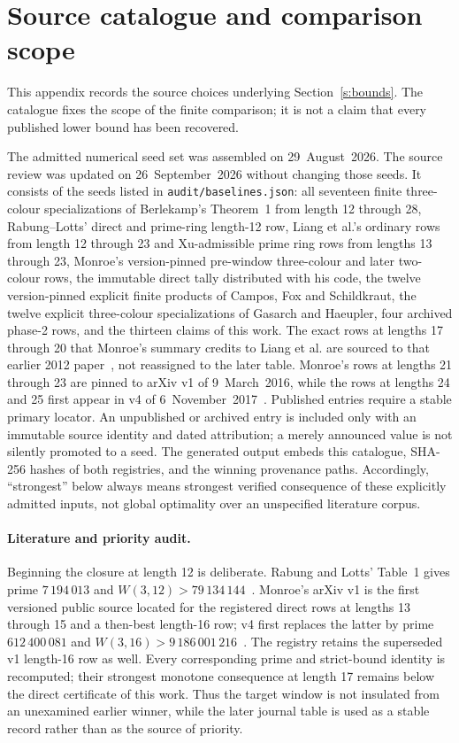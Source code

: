 \section{Source catalogue and comparison scope}\label{s:source-catalogue}

This appendix records the source choices underlying Section~\ref{s:bounds}.
The catalogue fixes the scope of the finite comparison; it is not a claim
that every published lower bound has been recovered.

The admitted numerical seed set was assembled on 29~August~2026. The source
review was updated on 26~September~2026 without changing those seeds. It consists of the
seeds listed in \texttt{audit/baselines.json}: all seventeen finite three-colour
specializations of Berlekamp's Theorem~1 from length 12 through 28,
Rabung--Lotts' direct and prime-ring length-12 row, Liang et al.'s ordinary rows
from length 12 through 23 and Xu-admissible prime ring rows from lengths 13 through 23,
Monroe's version-pinned pre-window three-colour and later two-colour rows, the
immutable direct tally distributed with his code, the twelve
version-pinned explicit finite products of Campos, Fox and Schildkraut, the
twelve explicit three-colour specializations of Gasarch and Haeupler, four
archived phase-2 rows, and the thirteen claims of this work. The exact rows at
lengths 17 through 20 that Monroe's summary credits to Liang et al. are sourced
to that earlier 2012 paper~\cite{liang2012}, not reassigned to the later table.
Monroe's rows at lengths 21 through 23 are pinned to arXiv v1 of
9~March~2016, while the rows at lengths 24 and 25 first appear in v4 of
6~November~2017~\cite{Monroe2016v1,Monroe2017v4}.
Published entries require a stable primary locator. An unpublished or
archived entry is included only with an immutable source identity and dated
attribution; a merely announced value is not silently promoted to a seed. The
generated output embeds this catalogue, SHA-256 hashes of both registries, and
the winning provenance paths. Accordingly, ``strongest'' below always means
strongest verified consequence of these explicitly admitted inputs, not global
optimality over an unspecified literature corpus.

\paragraph{Literature and priority audit.}
Beginning the closure at length 12 is deliberate. Rabung and Lotts' Table~1
gives prime $7\,194\,013$ and
$W(3,12)>79\,134\,144$~\cite{rabunglotts2012}. Monroe's arXiv v1 is the first
versioned public source located for the registered direct rows at lengths 13
through 15 and a then-best length-16 row; v4 first replaces the latter by
prime $612\,400\,081$ and
$W(3,16)>9\,186\,001\,216$~\cite{Monroe2016v1,Monroe2017v4}. The registry
retains the superseded v1 length-16 row as well. Every corresponding prime and
strict-bound identity is recomputed; their strongest monotone consequence at
length 17 remains below the direct certificate of this work. Thus the target
window is not insulated from an unexamined earlier winner, while the later
journal table is used as a stable record rather than as the source of priority.

